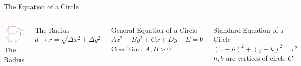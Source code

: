\documentclass[14pt,aspectratio=169]{beamer}
\begin{document}
\begin{frame}{The Equation of a Circle}
  \begin{columns}
   \centering
   \includegraphics[width=1\textwidth]{image07}\\The Radius
    \begin{block}{The Radius}\centering
     $d\to r=\sqrt{\Delta x^2 +\Delta y^2}$
    \end{block}

    \begin{block}{General Equation of a Circle} \centering
     $Ax^2 + By^2 + Cx + Dy + E = 0$\\
     Condition: $A,B > 0$
    \end{block}

    \begin{block}{Standard Equation of a Circle} \centering
     $(x-h)^2 + (y-k)^2 = r^2$ \\
     $h,k$ are vertices of circle $C$

    \end{block}



  \end{columns}

\end{frame}
\end{document}
